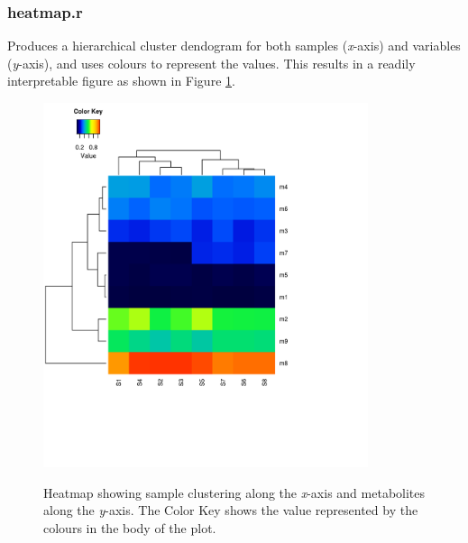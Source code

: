 \documentclass[english,a4paper,12pt]{article}
\begin{document}
\subsubsection*{heatmap.r}
Produces a hierarchical cluster dendogram for both samples (\emph{x}-axis) and variables (\emph{y}-axis), and uses colours to represent the values. This results in a readily interpretable figure as shown in Figure \ref{fig:heatmap}.

\begin{figure}[h!tb]
\centering
\includegraphics[width=0.85\textwidth]{images/heatmap.png} \\
\caption[Heatmap]{Heatmap showing sample clustering along the \emph{x}-axis and metabolites along the \emph{y}-axis. The Color Key shows the value represented by the colours in the body of the plot.}
\label{fig:heatmap}
\end{figure}
\end{document}
